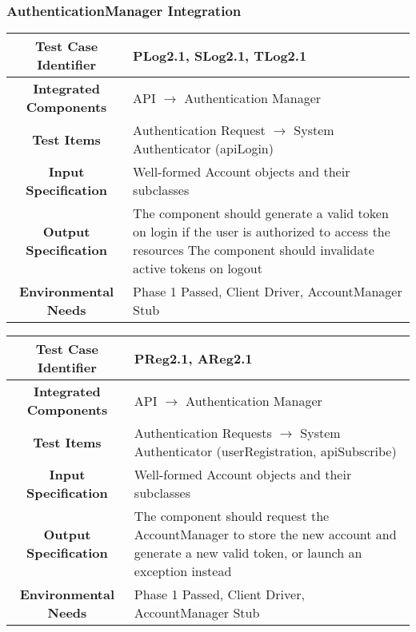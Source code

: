 \documentclass[11pt, a4paper,titlepage]{article}
\begin{document}
	 \subsubsection{AuthenticationManager Integration}
	 \begin{tabularx}{\textwidth}{| c|X|}
	 	\hline \textbf{Test Case Identifier} & \label{PLog2.1}PLog2.1, \label{SLog2.1}SLog2.1, \label{TLog2.1}TLog2.1 \\
	 	\hline \textbf{Integrated Components} &  API $\rightarrow $ Authentication Manager\\
	 	\hline \textbf{Test Items} &  Authentication Request $\rightarrow $ System Authenticator (apiLogin)\\
	 	\hline \textbf{Input Specification} &  Well-formed Account objects and their subclasses\\
	 	\hline \textbf{Output Specification} & The component should generate a valid token on login if the user is authorized to access the resources \newline
	 	The component should invalidate active tokens on logout \\
	 	\hline \textbf{Environmental Needs} &  Phase 1 Passed, Client Driver, AccountManager Stub \\
	 	\hline
	 \end{tabularx}
	 \newline
	 
	 \begin{tabularx}{\textwidth}{| c|X|}
	 	\hline \textbf{Test Case Identifier} &  \label{PReg2.1}PReg2.1, \label{AReg2.1}AReg2.1 \\
	 	\hline \textbf{Integrated Components} & API $\rightarrow $ Authentication Manager \\
	 	\hline \textbf{Test Items} &  Authentication Requests $\rightarrow $ System Authenticator (userRegistration, apiSubscribe)\\
	 	\hline \textbf{Input Specification} & Well-formed Account objects and their subclasses  \\
	 	\hline \textbf{Output Specification} & The component should request the AccountManager to store the new account and generate a new valid token, or launch an exception instead \\
	 	\hline \textbf{Environmental Needs} & Phase 1 Passed, Client Driver, AccountManager Stub \\
	 	\hline
	 \end{tabularx}
	 \newline
	 
\end{document}
